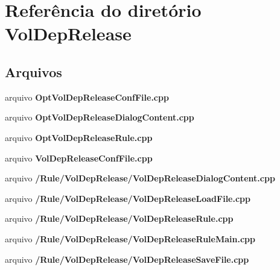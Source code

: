 \section{Referência do diretório Vol\+Dep\+Release}
\label{dir_415386c64b104915b65eee78224455de}
\subsection*{Arquivos}
\begin{DoxyCompactItemize}
\item 
arquivo {\bf Opt\+Vol\+Dep\+Release\+Conf\+File.\+cpp}
\item 
arquivo {\bf Opt\+Vol\+Dep\+Release\+Dialog\+Content.\+cpp}
\item 
arquivo {\bf Opt\+Vol\+Dep\+Release\+Rule.\+cpp}
\item 
arquivo {\bf Vol\+Dep\+Release\+Conf\+File.\+cpp}
\item 
arquivo {\bf /\+Rule/\+Vol\+Dep\+Release/\+Vol\+Dep\+Release\+Dialog\+Content.\+cpp}
\item 
arquivo {\bf /\+Rule/\+Vol\+Dep\+Release/\+Vol\+Dep\+Release\+Load\+File.\+cpp}
\item 
arquivo {\bf /\+Rule/\+Vol\+Dep\+Release/\+Vol\+Dep\+Release\+Rule.\+cpp}
\item 
arquivo {\bf /\+Rule/\+Vol\+Dep\+Release/\+Vol\+Dep\+Release\+Rule\+Main.\+cpp}
\item 
arquivo {\bf /\+Rule/\+Vol\+Dep\+Release/\+Vol\+Dep\+Release\+Save\+File.\+cpp}
\end{DoxyCompactItemize}
